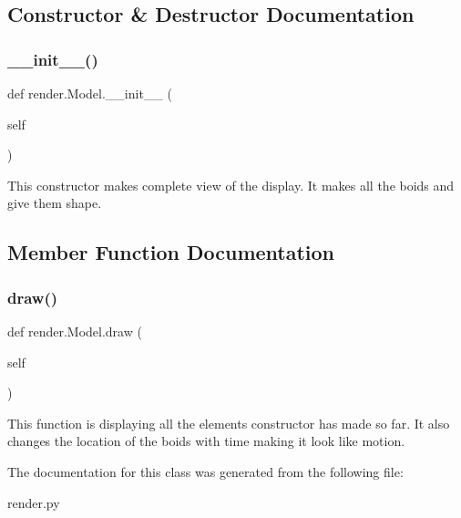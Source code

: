 \subsection{Constructor \& Destructor Documentation}
\mbox{\label{classrender_1_1Model_ad4cbfc4dcbc7cc1382a4c77029cf3f41}} 
\subsubsection{\texorpdfstring{\+\_\+\+\_\+init\+\_\+\+\_\+()}{\_\_init\_\_()}}
{\footnotesize\ttfamily def render.\+Model.\+\_\+\+\_\+init\+\_\+\+\_\+ (\begin{DoxyParamCaption}\item[{}]{self }\end{DoxyParamCaption})}

\begin{DoxyVerb}This constructor makes complete view of the display. It makes all the boids and give them shape.\end{DoxyVerb}
 

\subsection{Member Function Documentation}
\mbox{\label{classrender_1_1Model_ab61e840a08a8de692fa36cf9eb6aaf81}} 
\subsubsection{\texorpdfstring{draw()}{draw()}}
{\footnotesize\ttfamily def render.\+Model.\+draw (\begin{DoxyParamCaption}\item[{}]{self }\end{DoxyParamCaption})}

\begin{DoxyVerb}This function is displaying all the elements constructor has made so far. It also changes the location of the boids with time making it look like motion.\end{DoxyVerb}
 

The documentation for this class was generated from the following file\+:\begin{DoxyCompactItemize}
\item 
render.\+py\end{DoxyCompactItemize}
